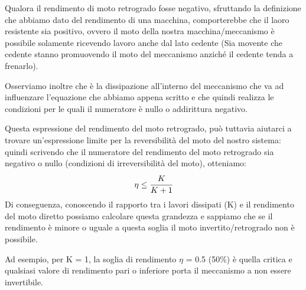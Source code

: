 Qualora il rendimento di moto retrogrado fosse negativo, sfruttando la definizione che abbiamo dato del rendimento di una macchina, comporterebbe che il laoro resistente sia positivo, ovvero il moto della nostra macchina/meccanismo è possibile solamente ricevendo lavoro anche dal lato cedente (Sia movente che cedente stanno promuovendo il moto del meccanismo anziché il cedente tenda a frenarlo).

Osserviamo inoltre che è la dissipazione all'interno del meccanismo che va ad influenzare l'equazione che abbiamo appena scritto e che quindi realizza le condizioni per le quali il numeratore è nullo o addirittura negativo.

Questa espressione del rendimento del moto retrogrado, può tuttavia aiutarci a trovare un'espressione limite per la reversibilità del moto del nostro sistema: quindi scrivendo che il numeratore del rendimento del moto retrogrado sia negativo o nullo (condizioni di irreversibilità del moto), otteniamo:
\[\eta \le \cfrac{K}{K+1}\]
Di conseguenza, conoscendo il rapporto tra i lavori dissipati (K) e il rendimento del moto diretto possiamo calcolare questa grandezza e sappiamo che se il rendimento è minore o uguale a questa soglia il moto invertito/retrogrado non è possibile.

Ad esempio, per K = 1, la soglia di rendimento $\eta$ = 0.5 (50\%) è quella critica e qualsiasi valore di rendimento pari o inferiore porta il meccanismo a non essere invertibile.\newline


